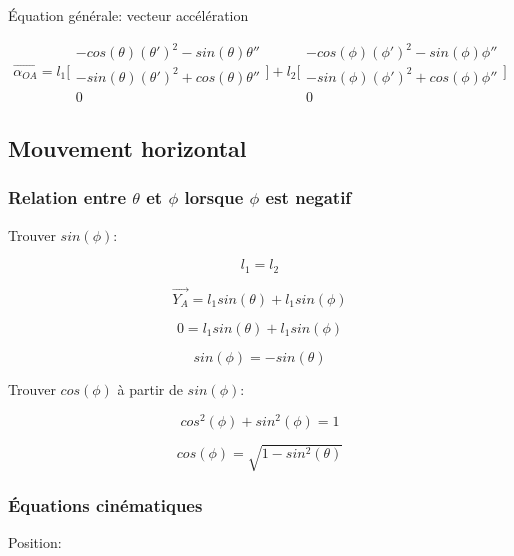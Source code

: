 \documentclass{article}
\begin{document}
\noindent Équation générale: vecteur accélération

\begin{equation}
\overrightarrow{\alpha_{OA}} =
	l_1\Bigg[\begin{array}{cc}
	-cos(\theta)(\theta')^2-sin(\theta)\theta'' \\
	-sin(\theta)(\theta')^2+cos(\theta)\theta'' \\
	0
	\end{array}\Bigg]
	+
	l_2\Bigg[\begin{array}{cc}
	-cos(\phi)(\phi')^2-sin(\phi)\phi'' \\
	-sin(\phi)(\phi')^2+cos(\phi)\phi'' \\
	0
	\end{array}\Bigg]
\end{equation}

\newpage
\subsection{Mouvement horizontal}
\subsubsection{Relation entre $\theta$ et $\phi$ lorsque $\phi$ est negatif}
\noindent Trouver $sin(\phi)$:

\begin{equation}
l_1 = l_2
\end{equation}

\begin{equation}
\overrightarrow{Y_A} = l_1sin(\theta)+l_1sin(\phi)
\end{equation}

\begin{equation}
0 = l_1sin(\theta)+l_1sin(\phi)
\end{equation}

\begin{equation}
sin(\phi) = -sin(\theta)
\end{equation}

\noindent Trouver $cos(\phi)$ à partir de $sin(\phi)$:

\begin{equation}
cos^2(\phi)+sin^2(\phi) = 1
\end{equation}

\begin{equation}
cos(\phi) = \sqrt{1-sin^2(\theta)}
\end{equation}

\subsubsection{Équations cinématiques}
\noindent Position:
\end{document}

